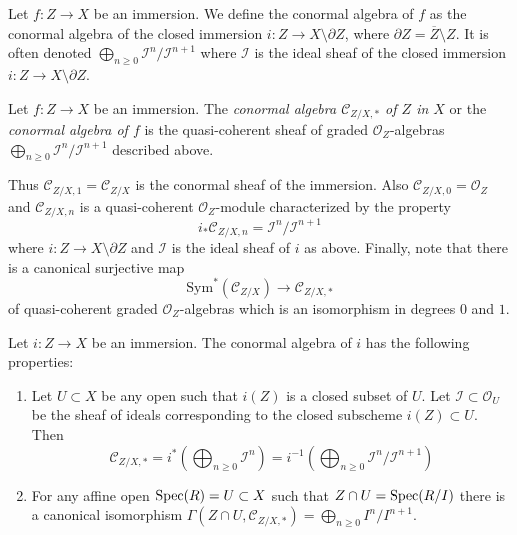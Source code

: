 \medskip\noindent
Let $f : Z \to X$ be an immersion. We define the conormal algebra of $f$
as the conormal algebra of the closed immersion
$i : Z \to X \setminus \partial Z$, where
$\partial Z = \overline{Z} \setminus Z$. It is often denoted
$\bigoplus_{n \geq 0} \mathcal{I}^n/\mathcal{I}^{n + 1}$
where $\mathcal{I}$ is the ideal sheaf
of the closed immersion $i : Z \to X \setminus \partial Z$.

\begin{definition}
\label{definition-conormal-sheaf}
Let $f : Z \to X$ be an immersion. The {\it conormal algebra
$\mathcal{C}_{Z/X, *}$ of $Z$ in $X$} or the {\it conormal algebra of $f$}
is the quasi-coherent sheaf of graded $\mathcal{O}_Z$-algebras
$\bigoplus_{n \geq 0} \mathcal{I}^n/\mathcal{I}^{n + 1}$ described above.
\end{definition}

\noindent
Thus $\mathcal{C}_{Z/X, 1} = \mathcal{C}_{Z/X}$ is the conormal sheaf
of the immersion. Also $\mathcal{C}_{Z/X, 0} = \mathcal{O}_Z$ and
$\mathcal{C}_{Z/X, n}$ is a quasi-coherent $\mathcal{O}_Z$-module
characterized by the property
\begin{equation}
\label{equation-conormal-in-degree-n}
i_*\mathcal{C}_{Z/X, n} = \mathcal{I}^n/\mathcal{I}^{n + 1}
\end{equation}
where $i : Z \to X \setminus \partial Z$ and $\mathcal{I}$ is the ideal
sheaf of $i$ as above. Finally, note that there is a canonical surjective
map
\begin{equation}
\label{equation-conormal-algebra-quotient}
\text{Sym}^*(\mathcal{C}_{Z/X}) \longrightarrow \mathcal{C}_{Z/X, *}
\end{equation}
of quasi-coherent graded $\mathcal{O}_Z$-algebras which is an isomorphism
in degrees $0$ and $1$.

\begin{lemma}
\label{lemma-affine-conormal-sheaf}
Let $i : Z \to X$ be an immersion. The conormal algebra
of $i$ has the following properties:
\begin{enumerate}
\item Let $U \subset X$ be any open such that $i(Z)$ is
a closed subset of $U$. Let $\mathcal{I} \subset \mathcal{O}_U$
be the sheaf of ideals corresponding to the closed subscheme
$i(Z) \subset U$. Then
$$
\mathcal{C}_{Z/X, *} =
i^*\left(\bigoplus\nolimits_{n \geq 0} \mathcal{I}^n\right) =
i^{-1}\left(
\bigoplus\nolimits_{n \geq 0} \mathcal{I}^n/\mathcal{I}^{n + 1}
\right)
$$
\item
For any affine open $\mathop{\mathrm{Spec}}(R) = U \subset X$
such that $Z \cap U = \mathop{\mathrm{Spec}}(R/I)$ there is a
canonical isomorphism
$\Gamma(Z \cap U, \mathcal{C}_{Z/X, *}) = \bigoplus_{n \geq 0} I^n/I^{n + 1}$.
\end{enumerate}
\end{lemma}

